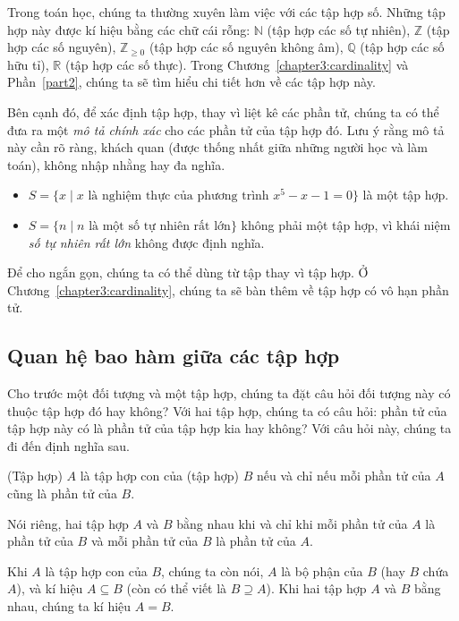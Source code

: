 Trong toán học, chúng ta thường xuyên làm việc với các tập hợp số. Những tập hợp này được kí hiệu bằng các chữ cái rỗng: $\mathbb{N}$ (tập hợp các số tự nhiên), $\mathbb{Z}$ (tập hợp các số nguyên), $\mathbb{Z}_{\geq 0}$ (tập hợp các số nguyên không âm), $\mathbb{Q}$ (tập hợp các số hữu tỉ), $\mathbb{R}$ (tập hợp các số thực). Trong Chương~\ref{chapter3:cardinality} và Phần~\ref{part2}, chúng ta sẽ tìm hiểu chi tiết hơn về các tập hợp này.

Bên cạnh đó, để xác định tập hợp, thay vì liệt kê các phần tử, chúng ta có thể đưa ra một \textit{mô tả chính xác} cho các phần tử của tập hợp đó. Lưu ý rằng mô tả này cần rõ ràng, khách quan (được thống nhất giữa những người học và làm toán), không nhập nhằng hay đa nghĩa.
\begin{itemize}
    \item $S = \{ x \mid \text{$x$ là nghiệm thực của phương trình $x^{5} - x - 1 = 0$} \}$ là một tập hợp.
    \item $S = \{ n \mid \text{$n$ là một số tự nhiên rất lớn} \}$ không phải một tập hợp, vì khái niệm \textit{số tự nhiên rất lớn} không được định nghĩa.
\end{itemize}

Để cho ngắn gọn, chúng ta có thể dùng từ tập thay vì tập hợp. Ở Chương~\ref{chapter3:cardinality}, chúng ta sẽ bàn thêm về tập hợp có vô hạn phần tử.

\subsection*{Quan hệ bao hàm giữa các tập hợp}

Cho trước một đối tượng và một tập hợp, chúng ta đặt câu hỏi đối tượng này có thuộc tập hợp đó hay không? Với hai tập hợp, chúng ta có câu hỏi: phần tử của tập hợp này có là phần tử của tập hợp kia hay không? Với câu hỏi này, chúng ta đi đến định nghĩa sau.

\begin{definition}
    (Tập hợp) $A$ là tập hợp con của (tập hợp) $B$ nếu và chỉ nếu mỗi phần tử của $A$ cũng là phần tử của $B$.

    Nói riêng, hai tập hợp $A$ và $B$ bằng nhau khi và chỉ khi mỗi phần tử của $A$ là phần tử của $B$ và mỗi phần tử của $B$ là phần tử của $A$.
\end{definition}

Khi $A$ là tập hợp con của $B$, chúng ta còn nói, $A$ là bộ phận của $B$ (hay $B$ chứa $A$), và kí hiệu $A\subseteq B$ (còn có thể viết là $B\supseteq A$). Khi hai tập hợp $A$ và $B$ bằng nhau, chúng ta kí hiệu $A = B$.

